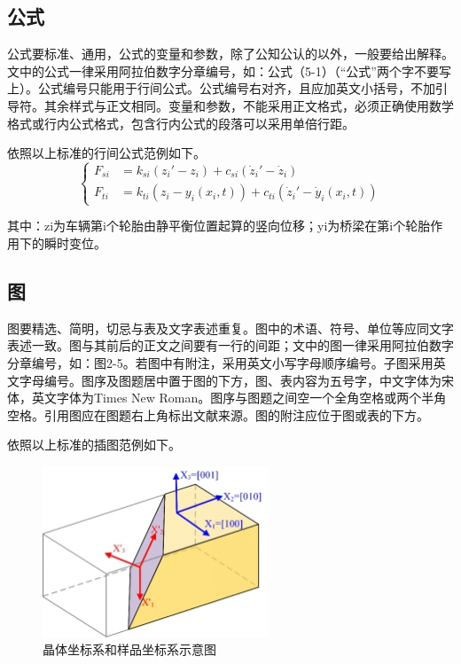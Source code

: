 \subsection{公式}

公式要标准、通用，公式的变量和参数，除了公知公认的以外，一般要给出解释。文中的公式一律采用阿拉伯数字分章编号，如：公式（5-1）（“公式”两个字不要写上）。公式编号只能用于行间公式。公式编号右对齐，且应加英文小括号，不加引导符。其余样式与正文相同。变量和参数，不能采用正文格式，必须正确使用数学格式或行内公式格式，包含行内公式的段落可以采用单倍行距。

依照以上标准的行间公式范例如下。
%
\begin{equation}
  \left\{
    \begin{aligned}
      F_{si} &= k_{si}(z_i' - z_i) + c_{si}(\dot{z}_i' - \dot{z}_i) \\
      F_{ti} &= k_{ti}(z_i-y_i(x_i, t)) + c_{ti}(\dot{z}_i'-\dot{y}_i(x_i, t))
    \end{aligned}
  \right.
  \label{eq:F}
\end{equation}

其中：zi为车辆第i个轮胎由静平衡位置起算的竖向位移；yi为桥梁在第i个轮胎作用下的瞬时变位。

\subsection{图}

图要精选、简明，切忌与表及文字表述重复。图中的术语、符号、单位等应同文字表述一致。图与其前后的正文之间要有一行的间距；文中的图一律采用阿拉伯数字分章编号，如：图2-5。若图中有附注，采用英文小写字母顺序编号。子图采用英文字母编号。图序及图题居中置于图的下方，图、表内容为五号字，中文字体为宋体，英文字体为Times New Roman。图序与图题之间空一个全角空格或两个半角空格。引用图应在图题右上角标出文献来源。图的附注应位于图或表的下方。

依照以上标准的插图范例如下。


\begin{figure}[!htbp]
  \centering
  \includegraphics[width=0.6\textwidth]{figures/sample1.png}
  \caption{晶体坐标系和样品坐标系示意图}
  \label{fig:sample1}
\end{figure}


